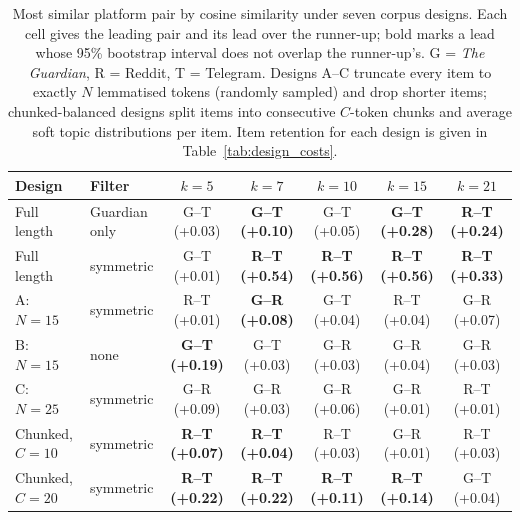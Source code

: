 
\begin{table}[H]
\caption{Most similar platform pair by cosine similarity under seven corpus designs.
Each cell gives the leading pair and its lead over the runner-up; bold marks a lead
whose 95\% bootstrap interval does not overlap the runner-up's. G = \textit{The Guardian},
R = Reddit, T = Telegram. Designs A--C truncate every item to exactly $N$ lemmatised
tokens (randomly sampled) and drop shorter items; chunked-balanced designs split items
into consecutive $C$-token chunks and average soft topic distributions per item.
Item retention for each design is given in Table~\ref{tab:design_costs}.\label{tab:length_designs}}
\centering
\small
\begin{tabular}{l l ccccc}
\toprule
Design & Filter & $k=5$ & $k=7$ & $k=10$ & $k=15$ & $k=21$ \\
\midrule
Full length          & Guardian only & G--T (+0.03) & \textbf{G--T (+0.10)} & G--T (+0.05) & \textbf{G--T (+0.28)} & \textbf{R--T (+0.24)} \\
Full length          & symmetric     & G--T (+0.01) & \textbf{R--T (+0.54)} & \textbf{R--T (+0.56)} & \textbf{R--T (+0.56)} & \textbf{R--T (+0.33)} \\
\midrule
A: $N=15$            & symmetric     & R--T (+0.01) & \textbf{G--R (+0.08)} & G--T (+0.04) & R--T (+0.04) & G--R (+0.07) \\
B: $N=15$            & none          & \textbf{G--T (+0.19)} & G--T (+0.03) & G--R (+0.03) & G--R (+0.04) & G--R (+0.03) \\
C: $N=25$            & symmetric     & G--R (+0.09) & G--R (+0.03) & G--R (+0.06) & G--R (+0.01) & R--T (+0.01) \\
\midrule
Chunked, $C=10$      & symmetric     & \textbf{R--T (+0.07)} & \textbf{R--T (+0.04)} & R--T (+0.03) & G--R (+0.01) & R--T (+0.03) \\
Chunked, $C=20$      & symmetric     & \textbf{R--T (+0.22)} & \textbf{R--T (+0.22)} & \textbf{R--T (+0.11)} & \textbf{R--T (+0.14)} & G--T (+0.04) \\
\bottomrule
\end{tabular}
\end{table}

